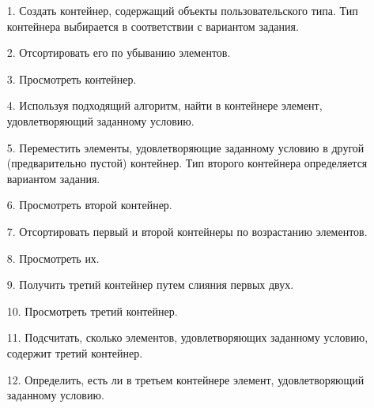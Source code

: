 \begin{enumerate}
    \item [1.] Создать контейнер, содержащий объекты пользовательского типа. Тип контейнера выбирается в соответствии с вариантом задания.
    \item [2.] Отсортировать его по убыванию элементов.
    \item [3.] Просмотреть контейнер.
    \item [4.] Используя подходящий алгоритм, найти в контейнере элемент, удовлетворяющий заданному условию.
    \item [5.] Переместить элементы, удовлетворяющие заданному условию в другой (предварительно пустой) контейнер. Тип второго контейнера определяется вариантом задания.
    \item [6.] Просмотреть второй контейнер.
    \item [7.] Отсортировать первый и второй контейнеры по возрастанию элементов.
    \item [8.] Просмотреть их.
    \item [9.] Получить третий контейнер путем слияния первых двух.
    \item [10.] Просмотреть третий контейнер.
    \item [11.] Подсчитать, сколько элементов, удовлетворяющих заданному условию, содержит третий контейнер.
    \item [12.] Определить, есть ли в третьем контейнере элемент, удовлетворяющий заданному условию.
\end{enumerate}

